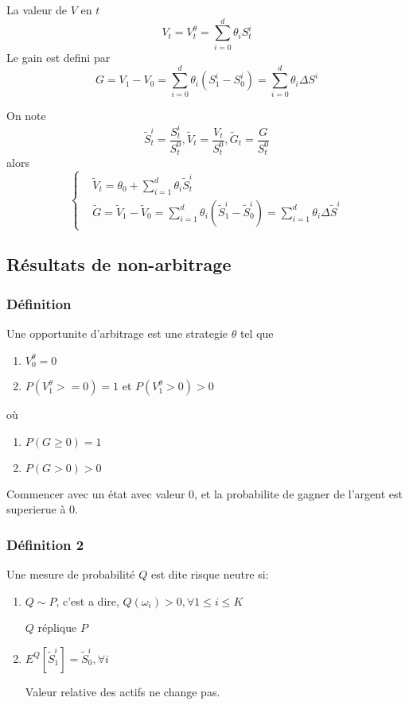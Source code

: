 \documentclass{article}
\theoremstyle{plain}
\theoremstyle{definition}
\begin{document}
La valeur de $V$ en $t$
\begin{equation}
V_t=V_t^\theta=\sum_{i=0}^d\theta_i S_t^i
\end{equation}
Le gain est defini par 
\begin{equation}
G=V_1-V_0=\sum_{i=0}^d \theta_i (S_1^i-S_0^i)=\sum_{i=0}^d \theta_i \Delta S^i
\end{equation}

On note
\begin{equation}
	\tilde{S}_t^i=\frac{S_t^i}{S_t^0},\tilde{V}_t=\frac{V_t}{S_t^0},\tilde{G}_t=\frac{G}{S_t^0}
\end{equation}
alors
\begin{equation}
\left \{ \begin{array}{ll}
&\tilde{V}_t =\theta_0+\sum_{i=1}^{d}\theta_i \tilde{S}_t^i\\
&\tilde{G} =\tilde{V}_1-\tilde{V}_0=\sum_{i=1}^d \theta_i (\tilde{S}_1^i-\tilde{S}_0^i)=\sum_{i=1}^d\theta_i\Delta \tilde{S}^i
\end{array}\right.
\end{equation}

\subsection{R\'esultats de non-arbitrage}
\subsubsection{D\'efinition}

Une opportunite d'arbitrage est une strategie $\theta$ tel que 
\begin{enumerate}
	\item  $V_0^\theta =0$
	\item $P(V_1^\theta >=0) = 1$ et $P(V_1^\theta>0)>0$ 
\end{enumerate}
o\`u
\begin{enumerate}
	\item $P(G\geq 0) = 1$
	\item $P(G>0) > 0$
\end{enumerate}

Commencer avec un \'etat avec valeur $0$, et la probabilite de gagner de l'argent est superierue \`a $0$.

\subsubsection{D\'efinition 2}

Une mesure de probabilit\'e $Q$ est dite risque neutre si:
\begin{enumerate}
	\item $Q\sim P$, c'est a dire, $Q(\omega_i)>0, \forall 1\leq i\leq K$
	
	$Q$ r\'eplique $P$
	
	\item $E^Q[\tilde{S}_1^i]=\tilde{S}_0^i, \forall i$
	
	Valeur relative des actifs ne change pas.
\end{enumerate}
\end{document}
